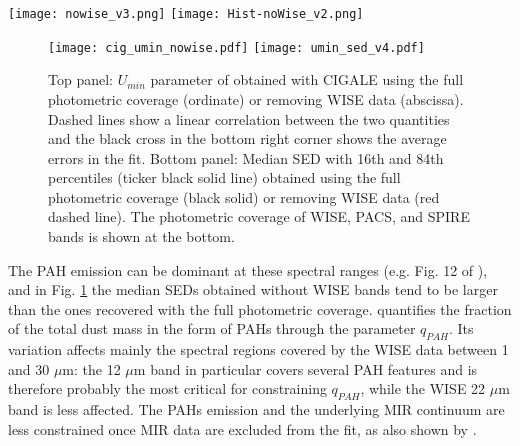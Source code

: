 \documentclass{aa}
\begin{document}
\begin{figure*}\begin{center}
\texttt{[image: nowise\_v3.png]}
\texttt{[image: Hist-noWise\_v2.png]}
\end{center} 
\caption{Top panels: Dust luminosity (L$_d$, top left), dust mass (M$_d$, top right), SFR (bottom left), and stellar mass (M$_\ast$, bottom right) obtained with CIGALE \citep{nol,boq} from the sample defined in Sect. \ref{sample} using the full photometric coverage (ordinate) or removing WISE data (abscissa). The blue dashed line shows a linear relation between the two quantities and the black cross in the bottom right corner shows the average errors in the fits. Bottom Panels: Histograms of the same quantities.}\label{nowise}\end{figure*}

\begin{figure}\begin{center}
\texttt{[image: cig\_umin\_nowise.pdf]}
\texttt{[image: umin\_sed\_v4.pdf]}
\end{center} 
\caption{Top panel: $U_{min}$ parameter of \cite{dra} obtained with CIGALE \citep{nol} using the full photometric coverage (ordinate) or removing WISE data (abscissa). Dashed lines show a linear correlation between the two quantities and the black cross in the bottom right corner shows the average errors in the fit. Bottom panel: Median SED with 16th and 84th percentiles (ticker black solid line) obtained using the full photometric coverage (black solid) or removing WISE data (red dashed line). The photometric coverage of WISE, PACS, and SPIRE bands is shown at the bottom.}\label{umin}\end{figure}

The PAH emission can be dominant at these spectral ranges (e.g. Fig. 12 of \citealt{dra}), and in Fig. \ref{umin} the median SEDs obtained without WISE bands tend to be larger than the ones recovered with the full photometric coverage. \cite{dra} quantifies the fraction of the total dust mass in the form of PAHs through the parameter $q_{PAH}$. Its variation affects mainly the spectral regions covered by the WISE data between 1 and 30 $\mu$m: the 12 $\mu$m band in particular covers several PAH features and is therefore probably the most critical for constraining $q_{PAH}$, while the WISE 22 $\mu$m band is less affected. The PAHs emission and the underlying MIR continuum are less constrained once MIR data are excluded from the fit, as also shown by \cite{ani}.
\end{document}

